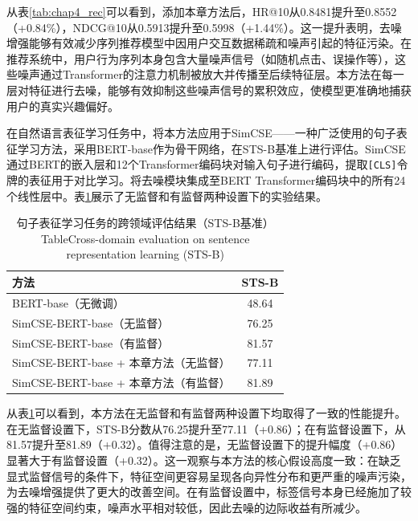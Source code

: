 从表\ref{tab:chap4_rec}可以看到，添加本章方法后，HR@10从0.8481提升至0.8552（+0.84\%），NDCG@10从0.5913提升至0.5998（+1.44\%）。这一提升表明，去噪增强能够有效减少序列推荐模型中因用户交互数据稀疏和噪声引起的特征污染。在推荐系统中，用户行为序列本身包含大量噪声信号（如随机点击、误操作等），这些噪声通过Transformer的注意力机制被放大并传播至后续特征层。本方法在每一层对特征进行去噪，能够有效抑制这些噪声信号的累积效应，使模型更准确地捕获用户的真实兴趣偏好。

在自然语言表征学习任务中，将本方法应用于SimCSE\cite{gao2021simcse}——一种广泛使用的句子表征学习方法，采用BERT-base\cite{devlin2019bert}作为骨干网络，在STS-B\cite{cer2017semeval}基准上进行评估。SimCSE通过BERT的嵌入层和12个Transformer编码块对输入句子进行编码，提取\texttt{[CLS]}令牌的表征用于对比学习。将去噪模块集成至BERT Transformer编码块中的所有24个线性层中。表\ref{tab:chap4_nlp}展示了无监督和有监督两种设置下的实验结果。

\begin{table}[htbp]
\centering
\caption{句子表征学习任务的跨领域评估结果（STS-B基准）\protect\\[-2pt]{\rm Table\;\thetable\quad Cross-domain evaluation on sentence representation learning (STS-B)}}\label{tab:chap4_nlp}
\vspace{0.2cm}
\renewcommand{\arraystretch}{1.2}
\begin{tabular}{l|c}
\hline\hline
方法 & STS-B \\
\hline
BERT-base（无微调） & 48.64 \\
SimCSE-BERT-base（无监督） & 76.25 \\
SimCSE-BERT-base（有监督） & 81.57 \\
\hline
SimCSE-BERT-base + 本章方法（无监督） & 77.11 \\
SimCSE-BERT-base + 本章方法（有监督） & 81.89 \\
\hline\hline
\end{tabular}
\end{table}

从表\ref{tab:chap4_nlp}可以看到，本方法在无监督和有监督两种设置下均取得了一致的性能提升。在无监督设置下，STS-B分数从76.25提升至77.11（+0.86）；在有监督设置下，从81.57提升至81.89（+0.32）。值得注意的是，无监督设置下的提升幅度（+0.86）显著大于有监督设置（+0.32）。这一观察与本方法的核心假设高度一致：在缺乏显式监督信号的条件下，特征空间更容易呈现各向异性分布和更严重的噪声污染，为去噪增强提供了更大的改善空间。在有监督设置中，标签信号本身已经施加了较强的特征空间约束，噪声水平相对较低，因此去噪的边际收益有所减少。

